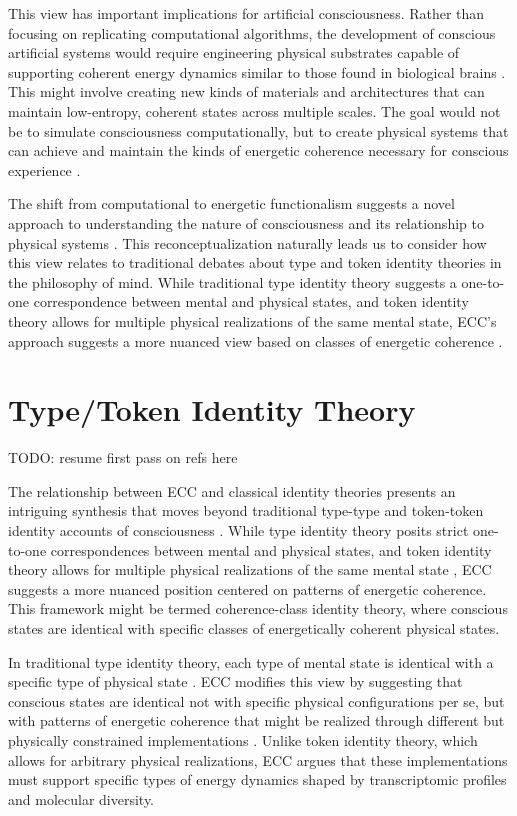 \begin{refsection}
This view has important implications for artificial consciousness. Rather than focusing on replicating computational algorithms, the development of conscious artificial systems would require engineering physical substrates capable of supporting coherent energy dynamics similar to those found in biological brains \cite{chemero2013radical}. This might involve creating new kinds of materials and architectures that can maintain low-entropy, coherent states across multiple scales. The goal would not be to simulate consciousness computationally, but to create physical systems that can achieve and maintain the kinds of energetic coherence necessary for conscious experience \cite{hutto2012radicalizing}.

The shift from computational to energetic functionalism suggests a novel approach to understanding the nature of consciousness and its relationship to physical systems \cite{nicholson2018everything}. This reconceptualization naturally leads us to consider how this view relates to traditional debates about type and token identity theories in the philosophy of mind. While traditional type identity theory suggests a one-to-one correspondence between mental and physical states, and token identity theory allows for multiple physical realizations of the same mental state, ECC's approach suggests a more nuanced view based on classes of energetic coherence \cite{gillett2016reduction}.

\section{Type/Token Identity Theory}

TODO: resume first pass on refs here

The relationship between ECC and classical identity theories presents an intriguing synthesis that moves beyond traditional type-type and token-token identity accounts of consciousness \cite{polger2009evaluating}. While type identity theory posits strict one-to-one correspondences between mental and physical states, and token identity theory allows for multiple physical realizations of the same mental state \cite{bechtel1999multiple}, ECC suggests a more nuanced position centered on patterns of energetic coherence. This framework might be termed coherence-class identity theory, where conscious states are identical with specific classes of energetically coherent physical states.

In traditional type identity theory, each type of mental state is identical with a specific type of physical state \cite{place1956is}. ECC modifies this view by suggesting that conscious states are identical not with specific physical configurations per se, but with patterns of energetic coherence that might be realized through different but physically constrained implementations \cite{shapiro2000multiple}. Unlike token identity theory, which allows for arbitrary physical realizations, ECC argues that these implementations must support specific types of energy dynamics shaped by transcriptomic profiles and molecular diversity.


\end{refsection}
